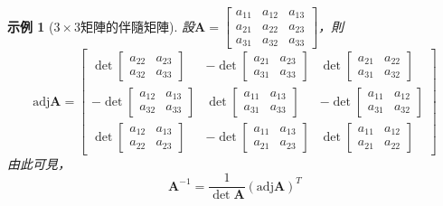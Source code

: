 \documentclass[12pt]{article}
\newcommand{\adj}{\mathrm{adj}}
\newtheorem*{example}{示例}
\begin{document}
    \begin{example}[$3\times 3$矩陣的伴隨矩陣]
        設$\mathbf{A}=\begin{bmatrix}
            a_{11}&a_{12}&a_{13}\\
            a_{21}&a_{22}&a_{23}\\
            a_{31}&a_{32}&a_{33}
        \end{bmatrix}$，則$$\adj{\mathbf{A}}=\begin{bmatrix}
            \det\begin{bmatrix}
                a_{22}&a_{23}\\
                a_{32}&a_{33}
            \end{bmatrix}&-\det\begin{bmatrix}
                a_{21}&a_{23}\\
                a_{31}&a_{33}
            \end{bmatrix}&\det\begin{bmatrix}
                a_{21}&a_{22}\\
                a_{31}&a_{32}
            \end{bmatrix}\\
            -\det\begin{bmatrix}
                a_{12}&a_{13}\\
                a_{32}&a_{33}
            \end{bmatrix}&\det\begin{bmatrix}
                a_{11}&a_{13}\\
                a_{31}&a_{33}
            \end{bmatrix}&-\det\begin{bmatrix}
                a_{11}&a_{12}\\
                a_{31}&a_{32}
            \end{bmatrix}\\
            \det\begin{bmatrix}
                a_{12}&a_{13}\\
                a_{22}&a_{23}
            \end{bmatrix}&-\det\begin{bmatrix}
                a_{11}&a_{13}\\
                a_{21}&a_{23}
            \end{bmatrix}&\det\begin{bmatrix}
                a_{11}&a_{12}\\
                a_{21}&a_{22}
            \end{bmatrix}
        \end{bmatrix}$$
        由此可見，$$\mathbf{A}^{-1}=\frac{1}{\det{\mathbf{A}}}(\adj{\mathbf{A}})^T$$
    \end{example}
\end{document}
